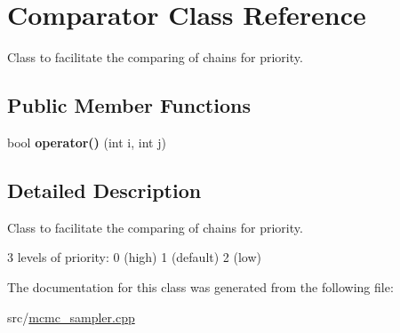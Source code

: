 \hypertarget{classComparator}{}\section{Comparator Class Reference}
\label{classComparator}


Class to facilitate the comparing of chains for priority.  


\subsection*{Public Member Functions}
\begin{DoxyCompactItemize}
\item 
\mbox{\label{classComparator_a86722ed93295cd82f73769c3b2892f47}} 
bool {\bfseries operator()} (int i, int j)
\end{DoxyCompactItemize}


\subsection{Detailed Description}
Class to facilitate the comparing of chains for priority. 

3 levels of priority\+: 0 (high) 1 (default) 2 (low) 

The documentation for this class was generated from the following file\+:\begin{DoxyCompactItemize}
\item 
src/\hyperlink{mcmc__sampler_8cpp}{mcmc\+\_\+sampler.\+cpp}\end{DoxyCompactItemize}
